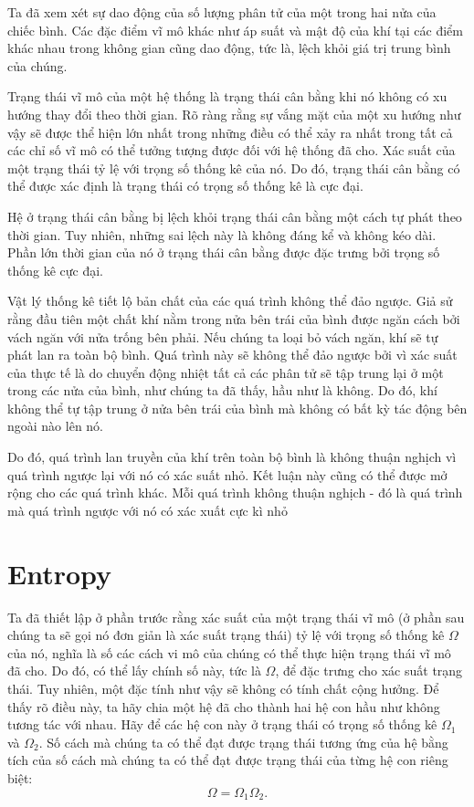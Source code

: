 Ta đã xem xét sự dao động của số lượng phân tử của một trong hai nửa của chiếc bình. Các đặc điểm vĩ mô khác như áp suất và mật độ của khí tại các điểm khác nhau trong không gian cũng dao động, tức là, lệch khỏi giá trị trung bình của chúng.

Trạng thái vĩ mô của một hệ thống là trạng thái cân bằng khi nó không có xu hướng thay đổi theo thời gian. Rõ ràng rằng sự vắng mặt của một xu hướng như vậy sẽ được thể hiện lớn nhất trong những điều có thể xảy ra nhất trong tất cả các chỉ số vĩ mô có thể tưởng tượng được đối với hệ thống đã cho. Xác suất của một trạng thái tỷ lệ với trọng số thống kê của nó. Do đó, trạng thái cân bằng có thể được xác định là trạng thái có trọng số thống kê là cực đại.

Hệ ở trạng thái cân bằng bị lệch khỏi trạng thái cân bằng một cách tự phát theo thời gian. Tuy nhiên, những sai lệch này là không đáng kể và không kéo dài. Phần lớn thời gian của nó ở trạng thái cân bằng được đặc trưng bởi trọng số thống kê cực đại.

Vật lý thống kê tiết lộ bản chất của các quá trình không thể đảo ngược. Giả sử rằng đầu tiên một chất khí nằm trong nửa bên trái của bình được ngăn cách bởi vách ngăn với nửa trống bên phải. Nếu chúng ta loại bỏ vách ngăn, khí sẽ tự phát lan ra toàn bộ bình. Quá trình này sẽ không thể đảo ngược bởi vì xác suất của thực tế là do chuyển động nhiệt tất cả các phân tử sẽ tập trung lại ở một trong các nửa của bình, như chúng ta đã thấy, hầu như là không. Do đó, khí không thể tự tập trung ở nửa bên trái của bình mà không có bất kỳ tác động bên ngoài nào lên nó.

Do đó, quá trình lan truyền của khí trên toàn bộ bình là không thuận nghịch vì quá trình ngược lại với nó có xác suất nhỏ. Kết luận này cũng có thể được mở rộng cho các quá trình khác. Mỗi quá trình không thuận nghịch - đó là quá trình mà quá trình ngược với nó có xác xuất cực kì nhỏ

\section{Entropy}\label{sec:11_11}

Ta đã thiết lập ở phần trước rằng xác suất của một trạng thái vĩ mô (ở phần sau chúng ta sẽ gọi nó đơn giản là xác suất trạng thái) tỷ lệ với trọng số thống kê $\Omega$ của nó, nghĩa là số các cách vi mô của chúng có thể thực hiện trạng thái vĩ mô đã cho. Do đó, có thể lấy chính số này, tức là $\Omega$, để đặc trưng cho xác suất trạng thái. Tuy nhiên, một đặc tính như vậy sẽ không có tính chất cộng hưởng. Để thấy rõ điều này, ta hãy chia một hệ đã cho thành hai hệ con hầu như không tương tác với nhau. Hãy để các hệ con này ở trạng thái có trọng số thống kê $\Omega_1$ và $\Omega_2$. Số cách mà chúng ta có thể đạt được trạng thái tương ứng của hệ bằng tích của số cách mà chúng ta có thể đạt được trạng thái của từng hệ con riêng biệt:
\begin{equation}\label{công thức:11_91}
	\Omega = \Omega_1\Omega_2.
\end{equation}

